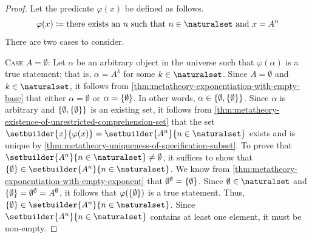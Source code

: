 \begin{proof}
    Let the predicate \( \varphi(x) \) be defined as follows.
    \begin{equation*}
        \varphi(x) \coloneq \text{there exists an \( n \) such that \( n \in \naturalset \) and \( x = A^{n} \)}
    \end{equation*}
    There are two cases to consider.

    \vspace{0.3cm}
    \noindent
    {\scshape Case} \( A = \emptyset \):
    Let \( \alpha \) be an arbitrary object in the universe such that \( \varphi(\alpha) \) is a true statement; that is,
    \( \alpha = A^{k} \) for some \( k \in \naturalset \). Since \( A = \emptyset \) and \( k \in \naturalset \), it follows from
    \cref{thm:metatheory-exponentiation-with-empty-base} that either \( \alpha = \emptyset \) or \( \alpha = \mleft\{ \emptyset \mright\} \).
    In other words, \( \alpha \in \mleft\{ \emptyset, \mleft\{ \emptyset \mright\} \mright\} \). Since \( \alpha \) is arbitrary
    and \( \mleft\{ \emptyset, \mleft\{ \emptyset \mright\} \mright\} \) is an existing set, it follows from
    \cref{thm:metatheory-existence-of-unrestricted-comprehension-set} that the set \( \setbuilder{x}{\varphi(x)} = \setbuilder{A^{n}}{n \in \naturalset} \) exists
    and is unique by \cref{thm:metatheory-uniqueness-of-specification-subset}.
    To prove that \( \setbuilder{A^{n}}{n \in \naturalset} \neq \emptyset \), it suffices to show that \( \mleft\{ \emptyset \mright\} \in \setbuilder{A^{n}}{n \in \naturalset} \).
    We know from \cref{thm:metatheory-exponentiation-with-empty-exponent} that \( \emptyset^{\emptyset} = \mleft\{ \emptyset \mright\} \).
    Since \( \emptyset \in \naturalset \) and \( \mleft\{ \emptyset \mright\} = \emptyset^{\emptyset} = A^{\emptyset} \),
    it follows that \( \varphi(\mleft\{ \emptyset \mright\}) \) is a true statement.
    Thus, \( \mleft\{ \emptyset \mright\} \in \setbuilder{A^{n}}{n \in \naturalset} \).
    Since \( \setbuilder{A^{n}}{n \in \naturalset} \) contains at least one element, it must be non-empty.


\end{proof}
